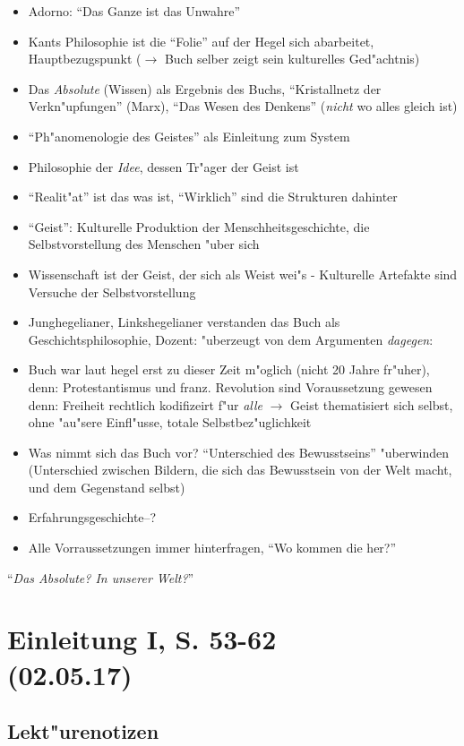 \documentclass[emulatestandardclasses]{scrartcl}
\begin{document}
\begin{itemize}
  \item Adorno: "`Das Ganze ist das Unwahre"'
  \item Kants Philosophie ist die "`Folie"' auf der Hegel sich abarbeitet, Hauptbezugspunkt ($\rightarrow$ Buch selber zeigt sein kulturelles Ged"achtnis)
  \item Das \emph{Absolute} (Wissen) als Ergebnis des Buchs, "`Kristallnetz der Verkn"upfungen"' (Marx), "`Das Wesen des Denkens"' (\emph{nicht} wo alles gleich ist)
  \item "`Ph"anomenologie des Geistes"' als Einleitung zum System
  \item Philosophie der \emph{Idee}, dessen Tr"ager der Geist ist
  \item "`Realit"at"' ist das was ist, "`Wirklich"' sind die Strukturen dahinter
  \item "`Geist"': Kulturelle Produktion der Menschheitsgeschichte, die Selbstvorstellung des Menschen "uber sich
  \item Wissenschaft ist der Geist, der sich als Weist wei"s - Kulturelle Artefakte sind Versuche der Selbstvorstellung
  \item Junghegelianer, Linkshegelianer verstanden das Buch als Geschichtsphilosophie, Dozent: "uberzeugt von dem Argumenten \emph{dagegen}: 
  \item Buch war laut hegel erst zu dieser Zeit m"oglich (nicht 20 Jahre fr"uher), denn: Protestantismus und franz. Revolution sind Voraussetzung gewesen denn: Freiheit rechtlich kodifizeirt f"ur \emph{alle} $\rightarrow$ Geist thematisiert sich selbst, ohne "au"sere Einfl"usse, totale Selbstbez"uglichkeit
  \item Was nimmt sich das Buch vor? "`Unterschied des Bewusstseins"' "uberwinden (Unterschied zwischen Bildern, die sich das Bewusstsein von der Welt macht, und dem Gegenstand selbst)
  \item Erfahrungsgeschichte--?
  \item Alle Vorraussetzungen immer hinterfragen, "`Wo kommen die her?"'
\end{itemize}

"`\emph{Das Absolute? In unserer Welt?}"'


\section{Einleitung I, S. 53-62\\(02.05.17)}



\subsection{Lekt"urenotizen}
\end{document}
